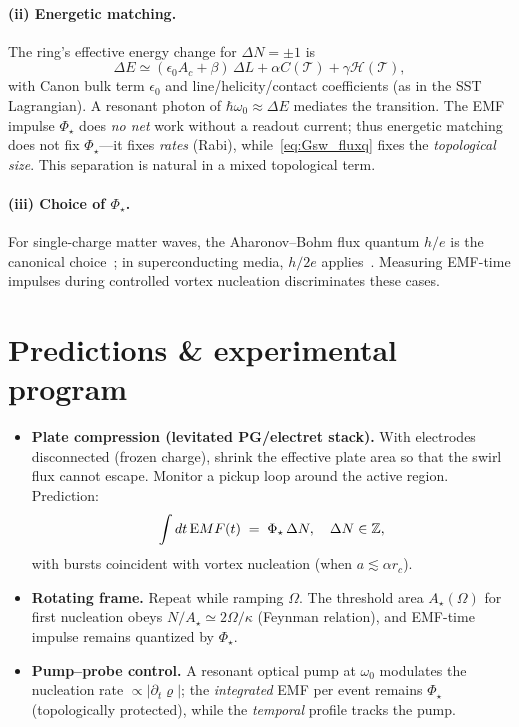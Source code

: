 \documentclass[reprint,aps,onecolumn,nofootinbib]{revtex4-2}
\begin{document}
\paragraph{(ii) Energetic matching.}
    The ring’s effective energy change for $\Delta N=\pm1$ is
    \begin{equation}
    \Delta E \simeq (\epsilon_0 A_c + \beta)\,\Delta L + \alpha C(\mathcal T)+\gamma \mathcal H(\mathcal T),
    \end{equation}
    with Canon bulk term $\epsilon_0$ and line/helicity/contact coefficients (as in the SST Lagrangian). A resonant photon of $\hbar\omega_0\!\approx\!\Delta E$ mediates the transition. The EMF impulse $\Phi_\star$ does \emph{no net} work without a readout current; thus energetic matching does not fix $\Phi_\star$—it fixes \emph{rates} (Rabi), while~\eqref{eq:Gsw_fluxq} fixes the \emph{topological size}. This separation is natural in a mixed topological term.

\paragraph{(iii) Choice of $\Phi_\star$.}
    For single-charge matter waves, the Aharonov--Bohm flux quantum $h/e$ is the canonical choice~\cite{Aharonov1959}; in superconducting media, $h/2e$ applies~\cite{Tinkham2004}. Measuring EMF-time impulses during controlled vortex nucleation discriminates these cases.

\section{Predictions \& experimental program}
\begin{itemize}
\item \textbf{Plate compression (levitated PG/electret stack).} With electrodes disconnected (frozen charge), shrink the effective plate area so that the swirl flux cannot escape. Monitor a pickup loop around the active region. Prediction:
\[
    \int dt\,{\textrm EMF}(t) \;=\; \Phi_\star\,\Delta N, \quad \Delta N\in\mathbb Z,
\]
with bursts coincident with vortex nucleation (when $a\lesssim\alpha r_c$).
\item \textbf{Rotating frame.} Repeat while ramping $\Omega$. The threshold area $A_\star(\Omega)$ for first nucleation obeys $N/A_\star\simeq 2\Omega/\kappa$ (Feynman relation), and EMF-time impulse remains quantized by $\Phi_\star$.
\item \textbf{Pump--probe control.} A resonant optical pump at $\omega_0$ modulates the nucleation rate $\propto |\partial_t \bm{\varrho}|$; the \emph{integrated} EMF per event remains $\Phi_\star$ (topologically protected), while the \emph{temporal} profile tracks the pump.
\end{itemize}
\end{document}
